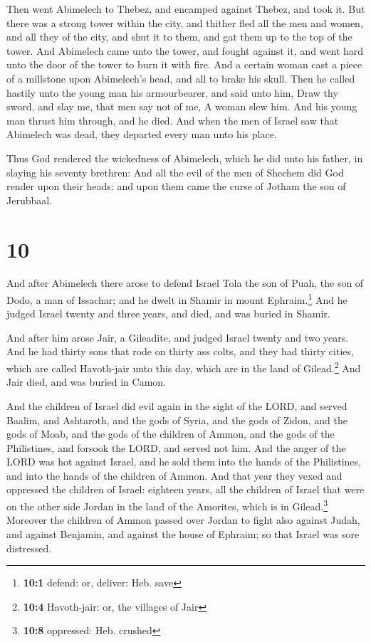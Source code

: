 Then went Abimelech to Thebez, and encamped against
Thebez, and took it.  But there was a strong tower within
the city, and thither fled all the men and women, and all they of the
city, and shut it to them, and gat them up to the top of the tower.
 And Abimelech came unto the tower, and fought against
it, and went hard unto the door of the tower to burn it with fire.
 And a certain woman cast a piece of a millstone upon
Abimelech's head, and all to brake his skull.  Then he
called hastily unto the young man his armourbearer, and said unto him,
Draw thy sword, and slay me, that men say not of me, A woman slew him.
And his young man thrust him through, and he died.  And
when the men of Israel saw that Abimelech was dead, they departed every
man unto his place.

 Thus God rendered the wickedness of Abimelech, which he
did unto his father, in slaying his seventy brethren: 
And all the evil of the men of Shechem did God render upon their heads:
and upon them came the curse of Jotham the son of Jerubbaal.

\hypertarget{section-9}{%
\section{10}\label{section-9}}

 And after Abimelech there arose to defend Israel Tola the
son of Puah, the son of Dodo, a man of Issachar; and he dwelt in Shamir
in mount Ephraim.\footnote{\textbf{10:1} defend: or, deliver: Heb. save}
 And he judged Israel twenty and three years, and died,
and was buried in Shamir.

 And after him arose Jair, a Gileadite, and judged Israel
twenty and two years.  And he had thirty sons that rode on
thirty ass colts, and they had thirty cities, which are called
Havoth-jair unto this day, which are in the land of Gilead.\footnote{\textbf{10:4}
  Havoth-jair: or, the villages of Jair}  And Jair died,
and was buried in Camon.

 And the children of Israel did evil again in the sight of
the LORD, and served Baalim, and Ashtaroth, and the gods of Syria, and
the gods of Zidon, and the gods of Moab, and the gods of the children of
Ammon, and the gods of the Philistines, and forsook the LORD, and served
not him.  And the anger of the LORD was hot against
Israel, and he sold them into the hands of the Philistines, and into the
hands of the children of Ammon.  And that year they vexed
and oppressed the children of Israel: eighteen years, all the children
of Israel that were on the other side Jordan in the land of the
Amorites, which is in Gilead.\footnote{\textbf{10:8} oppressed: Heb.
  crushed}  Moreover the children of Ammon passed over
Jordan to fight also against Judah, and against Benjamin, and against
the house of Ephraim; so that Israel was sore distressed.

